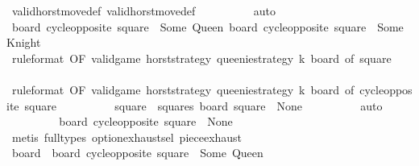 \begin{isabellebody}
\ valid{\isacharunderscore}horst{\isacharunderscore}move{\isacharunderscore}def\ valid{\isacharunderscore}horst{\isacharunderscore}move{\isacharprime}{\isacharunderscore}def\isanewline
\ \ \ \ \ \ \ \ \isamarkupfalse%
\ auto\isanewline
\ \ \ \ \ \ \isamarkupfalse%
\ {\isachardoublequoteopen}board\ {\isacharparenleft}cycle{\isacharunderscore}opposite\ square{\isacharparenright}\ {\isasymnoteq}\ Some\ Queen{\isachardoublequoteclose}\ {\isachardoublequoteopen}board\ {\isacharparenleft}cycle{\isacharunderscore}opposite\ square{\isacharparenright}\ {\isasymnoteq}\ Some\ Knight{\isachardoublequoteclose}\isanewline
\ \ \ \ \ \ \ \ \isamarkupfalse%
\ {}{\isacharbrackleft}rule{\isacharunderscore}format{\isacharcomma}\ OF\ {\isacharbackquoteopen}valid{\isacharunderscore}game\ horst{\isacharunderscore}strategy\ {\isacharquery}queenie{\isacharunderscore}strategy\ k\ board{\isacharbackquoteclose}{\isacharcomma}\ of\ square{\isacharbrackright}\isanewline
\ \ \ \ \ \ \ \ \isamarkupfalse%
\ {}{\isacharbrackleft}rule{\isacharunderscore}format{\isacharcomma}\ OF\ {\isacharbackquoteopen}valid{\isacharunderscore}game\ horst{\isacharunderscore}strategy\ {\isacharquery}queenie{\isacharunderscore}strategy\ k\ board{\isacharbackquoteclose}{\isacharcomma}\ of\ {\isachardoublequoteopen}cycle{\isacharunderscore}opposite\ square{\isachardoublequoteclose}{\isacharbrackright}\isanewline
\ \ \ \ \ \ \ \ \isamarkupfalse%
\ {\isacharbackquoteopen}square\ {\isasymin}\ squares{\isacharbackquoteclose}\ {\isacharbackquoteopen}board\ square\ {\isacharequal}\ None{\isacharbackquoteclose}\isanewline
\ \ \ \ \ \ \ \ \isamarkupfalse%
\ auto\isanewline
\ \ \ \ \ \ \isamarkupfalse%
\ \isamarkupfalse%
\ {\isachardoublequoteopen}board\ {\isacharparenleft}cycle{\isacharunderscore}opposite\ square{\isacharparenright}\ {\isacharequal}\ None{\isachardoublequoteclose}\isanewline
\ \ \ \ \ \ \ \ \isamarkupfalse%
\ {\isacharparenleft}metis\ {\isacharparenleft}full{\isacharunderscore}types{\isacharparenright}\ option{\isachardot}exhaust{\isacharunderscore}sel\ piece{\isachardot}exhaust{\isacharparenright}\isanewline
\isanewline
\ \ \ \ \ \ \isamarkupfalse%
\ {\isacharquery}board\ {\isacharequal}\ {\isachardoublequoteopen}board{\isacharprime}\ {\isacharparenleft}cycle{\isacharunderscore}opposite\ square\ {\isacharcolon}{\isacharequal}\ Some\ Queen{\isacharparenright}{\isachardoublequoteclose}\isanewline
\ \ \ \ \ \ \isamarkupfalse%

\end{isabellebody}
